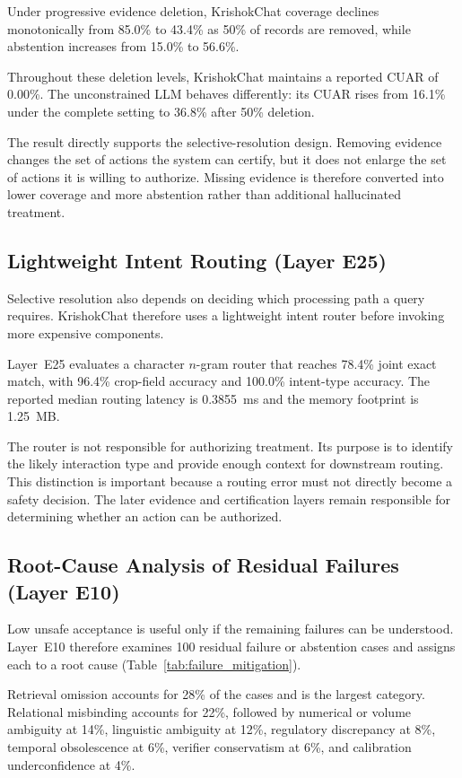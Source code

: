 \documentclass[a4paper,fleqn]{cas-dc}
\begin{document}
Under progressive evidence deletion, KrishokChat coverage declines monotonically from 85.0\% to 43.4\% as 50\% of records are removed, while abstention increases from 15.0\% to 56.6\%.

Throughout these deletion levels, KrishokChat maintains a reported CUAR of 0.00\%. The unconstrained LLM behaves differently: its CUAR rises from 16.1\% under the complete setting to 36.8\% after 50\% deletion.

The result directly supports the selective-resolution design. Removing evidence changes the set of actions the system can certify, but it does not enlarge the set of actions it is willing to authorize. Missing evidence is therefore converted into lower coverage and more abstention rather than additional hallucinated treatment.

\subsection{Lightweight Intent Routing (Layer E25)}

Selective resolution also depends on deciding which processing path a query requires. KrishokChat therefore uses a lightweight intent router before invoking more expensive components.

Layer~E25 evaluates a character $n$-gram router that reaches 78.4\% joint exact match, with 96.4\% crop-field accuracy and 100.0\% intent-type accuracy. The reported median routing latency is 0.3855~ms and the memory footprint is 1.25~MB.

The router is not responsible for authorizing treatment. Its purpose is to identify the likely interaction type and provide enough context for downstream routing. This distinction is important because a routing error must not directly become a safety decision. The later evidence and certification layers remain responsible for determining whether an action can be authorized.

\subsection{Root-Cause Analysis of Residual Failures (Layer E10)}

Low unsafe acceptance is useful only if the remaining failures can be understood. Layer~E10 therefore examines 100 residual failure or abstention cases and assigns each to a root cause (Table~\ref{tab:failure_mitigation}).

Retrieval omission accounts for 28\% of the cases and is the largest category. Relational misbinding accounts for 22\%, followed by numerical or volume ambiguity at 14\%, linguistic ambiguity at 12\%, regulatory discrepancy at 8\%, temporal obsolescence at 6\%, verifier conservatism at 6\%, and calibration underconfidence at 4\%.
\end{document}
